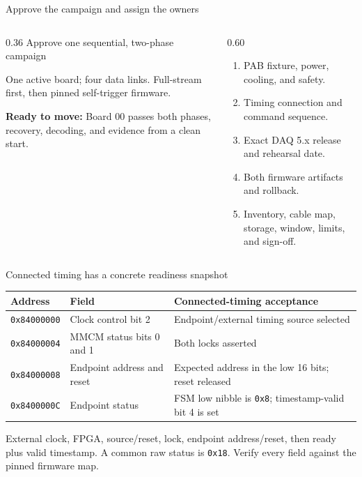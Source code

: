 \documentclass[aspectratio=169,11pt]{beamer}
\begin{document}
\begin{frame}{Approve the campaign and assign the owners}
  \begin{columns}[T,onlytextwidth]
    \begin{column}{0.36\textwidth}
        {Approve one sequential, two-phase campaign}
        {One active board; four data links. Full-stream first, then pinned self-trigger firmware.\par\medskip
         \textbf{Ready to move:} Board 00 passes both phases, recovery, decoding, and evidence from a clean start.}
    \end{column}
    \begin{column}{0.60\textwidth}
      \small
      \begin{enumerate}
        \DuneTightList
        \item PAB fixture, power, cooling, and safety.
        \item Timing connection and command sequence.
        \item Exact DAQ 5.x release and rehearsal date.
        \item Both firmware artifacts and rollback.
        \item Inventory, cable map, storage, window, limits, and sign-off.
      \end{enumerate}
    \end{column}
  \end{columns}

\end{frame}

\appendix

\begin{frame}{Connected timing has a concrete readiness snapshot}
  \small
  \renewcommand{\arraystretch}{1.22}
  \begin{tabularx}{\textwidth}{@{}p{} p{} X@{}}
    \toprule
    Address & Field & Connected-timing acceptance \\
    \midrule
    \texttt{0x84000000} & Clock control bit 2 & Endpoint/external timing source selected \\
    \texttt{0x84000004} & MMCM status bits 0 and 1 & Both locks asserted \\
    \texttt{0x84000008} & Endpoint address and reset & Expected address in the low 16 bits; reset released \\
    \texttt{0x8400000C} & Endpoint status & FSM low nibble is \texttt{0x8}; timestamp-valid bit 4 is set \\
    \bottomrule
  \end{tabularx}

  \medskip
    {External clock, FPGA, source/reset, lock, endpoint address/reset, then ready plus valid timestamp. A common raw status is \texttt{0x18}. Verify every field against the pinned firmware map.}
\end{frame}
\end{document}
